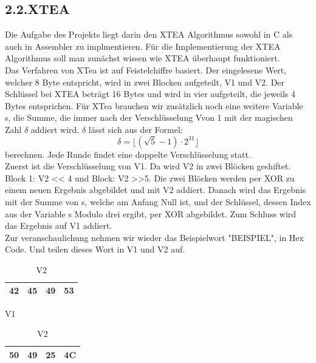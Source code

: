 \documentclass[course=asp]{aspdoc}
\begin{document}
\subsection*{2.2.XTEA}
Die Aufgabe des Projekts liegt darin den XTEA Algorithmus sowohl in C als auch in Assembler zu implmentieren. Für die Implementierung der XTEA Algorithmus soll man zunächst wissen wie XTEA überhaupt funktioniert. \\
Das Verfahren von XTea ist auf Feistelchiffre basiert. Der eingelesene Wert, welcher 8 Byte entspricht, wird in zwei Blocken aufgeteilt, V1 und V2. Der Schlüssel bei XTEA beträgt 16 Bytes und wird in vier aufgeteilt, die jeweils 4 Bytes entsprichen. Für XTea brauchen wir zusätzlich noch eine weitere Variable s, die Summe, die immer nach der Verschlüsselung Vvon 1 mit der magischen Zahl ${\delta}$ addiert wird. ${\delta}$ lässt sich aus der Formel:
\begin{equation}
     \delta  =   \lfloor ( \surd 5 -1)  \cdot  2^{31} \rfloor
\end{equation}
berechnen. Jede Runde findet eine doppelte Verschlüsselung statt. \\
Zuerst ist die Verschlüsselung von V1. Da wird V2 in zwei Blöcken geshiftet. Block 1: V2 << 4 und Block: V2 >>5. Die zwei Blöcken werden per XOR zu einem neuen Ergebnis abgebildet und mit V2 addiert. Danach wird das Ergebnis mit der Summe von s, welche am Anfang Null ist, und der Schlüssel, dessen Index aus der Variable s Modulo drei ergibt, per XOR abgebildet. Zum Schluss wird das Ergebnis auf V1 addiert. \\
Zur veranschaulichung nehmen wir wieder das Beispielwort "BEISPIEL", in Hex Code. Und teilen dieses Wort in V1 und V2 auf.  
\begin{table}[H]
    
    \begin{minipage}{.5\linewidth}
      
      \centering
        \begin{tabular}{|l|l|l|l|}
		\hline
            42 & 45 & 49 & 53   \\
		\hline
        \end{tabular}

	\caption{V1}
    \end{minipage}%
    \begin{minipage}{.5\linewidth}
    
 \centering
        
        \begin{tabular}{|l|l|l|l|}
           \hline
		 50 & 49 & 25 & 4C   \\
		\hline
        \end{tabular}
\caption{V2} 
    \end{minipage}
\end{table}
\end{document}
